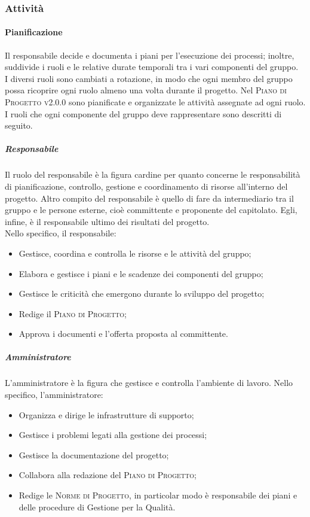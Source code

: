 \documentclass[../norme-di-progetto.tex]{subfiles}
\begin{document}
\subsubsection{Attività}
\paragraph{Pianificazione}
Il responsabile decide e documenta i piani per l'esecuzione dei processi; inoltre, suddivide i ruoli e le relative durate temporali tra i vari componenti del gruppo. \\
I diversi ruoli sono cambiati a rotazione, in modo che ogni membro del gruppo possa ricoprire ogni ruolo almeno una volta durante il progetto. Nel \textsc{Piano di Progetto v2.0.0} sono pianificate e organizzate le attività assegnate ad ogni ruolo. \\
I ruoli che ogni componente del gruppo deve rappresentare sono descritti di seguito.
\subparagraph{Responsabile}
Il ruolo del responsabile è la figura cardine per quanto concerne le responsabilità di pianificazione, controllo, gestione e coordinamento di risorse all'interno del progetto. Altro compito del responsabile è quello di fare da intermediario tra il gruppo e le persone esterne, cioè committente e proponente del capitolato. Egli, infine, è il responsabile ultimo dei risultati del progetto. \\
Nello specifico, il responsabile:
\begin{itemize}
  \item Gestisce, coordina e controlla le risorse e le attività del gruppo;
  \item Elabora e gestisce i piani e le scadenze dei componenti del gruppo;
  \item Gestisce le criticità che emergono durante lo sviluppo del progetto;
  \item Redige il \textsc{Piano di Progetto};
  \item Approva i documenti e l'offerta proposta al committente.
\end{itemize}

\subparagraph{Amministratore}
L'amministratore è la figura che gestisce e controlla l'ambiente di lavoro. Nello specifico, l'amministratore:
\begin{itemize}
  \item Organizza e dirige le infrastrutture di supporto;
  \item Gestisce i problemi legati alla gestione dei processi;
  \item Gestisce la documentazione del progetto;
  \item Collabora alla redazione del \textsc{Piano di Progetto};
  \item Redige le \textsc{Norme di Progetto}, in particolar modo è responsabile dei piani e delle procedure di Gestione per la Qualità.
\end{itemize}
\end{document}
